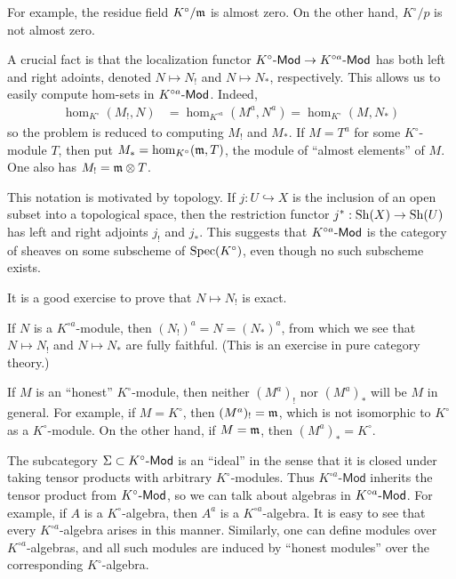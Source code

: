 \documentclass{article}
\begin{document}
For example, the residue field $K^\circ/\mathfrak{m}$ is almost zero. On the other hand, 
$K^\circ/p$ is not almost zero. 

A crucial fact is that the localization functor $K^\circ\text{-}\mathsf{Mod} \to K^{\circ a}\text{-}\mathsf{Mod}$ has both left and right adoints, denoted $N\mapsto N_!$ and 
$N\mapsto N_\ast$, respectively. This allows us to easily compute hom-sets in 
$K^{\circ a}\text{-}\mathsf{Mod}$. Indeed, 
\begin{align*}
  \hom_{K^\circ}(M_!,N) &= \hom_{K^{\circ a}}(M^a,N^a) = \hom_{K^\circ}(M,N_\ast)
\end{align*}
so the problem is reduced to computing $M_!$ and $M_\ast$. If 
$M=T^a$ for some $K^\circ$-module $T$, then put 
$M_\ast = \hom_{K^\circ}(\mathfrak{m},T)$, the module of ``almost elements'' of $M$. 
One also has $M_! = \mathfrak{m}\otimes T$. 

This notation is motivated by topology. If $j:U\hookrightarrow X$ is the inclusion 
of an open subset into a topological space, then the restriction functor 
$j^\ast:\operatorname{Sh}(X) \to \operatorname{Sh}(U)$ has left and right adjoints 
$j_!$ and $j_\ast$. This suggests that $K^{\circ a}\text{-}\mathsf{Mod}$ is the category 
of sheaves on some subscheme of $\operatorname{Spec}(K^\circ)$, even though no such subscheme 
exists. 

It is a good exercise to prove that $N\mapsto N_!$ is exact. 

If $N$ is a $K^{\circ a}$-module, then $(N_!)^a = N = (N_\ast)^a$, from which we 
see that $N\mapsto N_!$ and $N\mapsto N_\ast$ are fully faithful. (This is an 
exercise in pure category theory.) 

If $M$ is an ``honest'' $K^\circ$-module, then neither 
$(M^a)_!$ nor $(M^a)_\ast$ will be $M$ in general. For example, if $M=K^\circ$, 
then $(M^a)_! = \mathfrak{m}$, which is not isomorphic to $K^\circ$ as a $K^\circ$-module. 
On the other hand, if $M=\mathfrak{m}$, then $(M^a)_\ast = K^\circ$. 

The subcategory $\Sigma\subset K^\circ\text{-}\mathsf{Mod}$ is an ``ideal'' in the sense that 
it is closed under taking tensor products with arbitrary $K^\circ$-modules. Thus 
$K^{\circ a}\text{-}\mathsf{Mod}$ inherits the tensor product from $K^\circ\text{-}\mathsf{Mod}$, 
so we can talk about algebras in $K^{\circ a}\text{-}\mathsf{Mod}$. For example, if 
$A$ is a $K^\circ$-algebra, then $A^a$ is a $K^{\circ a}$-algebra. It is easy to see that 
every $K^{\circ a}$-algebra arises in this manner. Similarly, one can define 
modules over $K^{\circ a}$-algebras, and all such modules are induced by ``honest 
modules'' over the corresponding $K^\circ$-algebra. 
\end{document}
